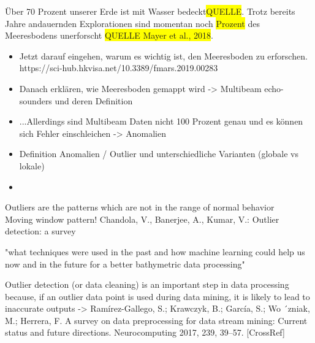 Über 70 Prozent unserer Erde ist mit Wasser bedeckt\colorbox{yellow}{QUELLE}. Trotz bereits Jahre andauernden Explorationen sind momentan noch  \colorbox{yellow}{Prozent} des Meeresbodens unerforscht \colorbox{yellow}{QUELLE Mayer et al., 2018}. 

\begin{itemize}
	\item Jetzt darauf eingehen, warum es wichtig ist, den Meeresboden zu erforschen. https://sci-hub.hkvisa.net/10.3389/fmars.2019.00283
	\item Danach erklären, wie Meeresboden gemappt wird -> Multibeam echo-sounders und deren Definition 
	\item ...Allerdings sind Multibeam Daten nicht 100 Prozent genau und es können sich Fehler einschleichen -> Anomalien
	\item Definition Anomalien / Outlier und unterschiedliche Varianten (globale vs lokale)
	\item 
\end{itemize}


Outliers are the patterns which are not in the range of normal behavior \cite{vinuthaDetectionOutliersUsing2018} \linebreak
\\
Moving window pattern! \linebreak
Chandola, V., Banerjee, A., Kumar, V.: Outlier detection: a survey\linebreak

"what techniques were used in the past and how machine learning
could help us now and in the future for a better bathymetric
data processing" \linebreak

Outlier detection (or data
cleaning) is an important step in data processing because, if an outlier data point is used
during data mining, it is likely to lead to inaccurate outputs -> 
Ramírez-Gallego, S.; Krawczyk, B.; García, S.; Wo ´zniak, M.; Herrera, F. A survey on data preprocessing for data stream mining:
Current status and future directions. Neurocomputing 2017, 239, 39–57. [CrossRef]
